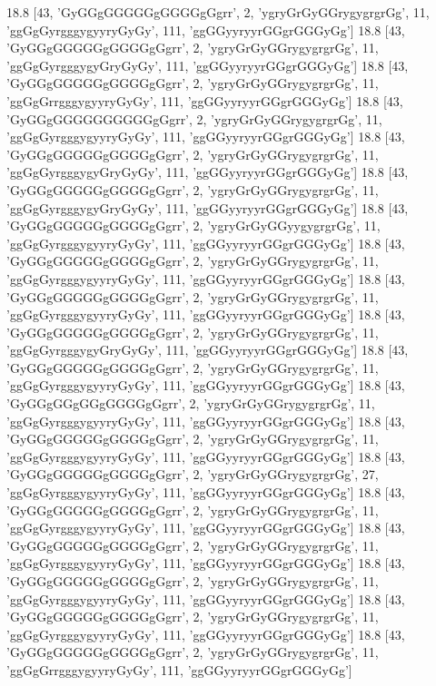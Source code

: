 18.8 [43, 'GyGGgGGGGGgGGGGgGgrr', 2, 'ygryGrGyGGrygygrgrGg', 11, 'ggGgGyrgggygyyryGyGy', 111, 'ggGGyyryyrGGgrGGGyGg']
18.8 [43, 'GyGGgGGGGGgGGGGgGgrr', 2, 'ygryGrGyGGrygygrgrGg', 11, 'ggGgGyrgggygyGryGyGy', 111, 'ggGGyyryyrGGgrGGGyGg']
18.8 [43, 'GyGGgGGGGGgGGGGgGgrr', 2, 'ygryGrGyGGrygygrgrGg', 11, 'ggGgGrrgggygyyryGyGy', 111, 'ggGGyyryyrGGgrGGGyGg']
18.8 [43, 'GyGGgGGGGGGGGGGgGgrr', 2, 'ygryGrGyGGrygygrgrGg', 11, 'ggGgGyrgggygyyryGyGy', 111, 'ggGGyyryyrGGgrGGGyGg']
18.8 [43, 'GyGGgGGGGGgGGGGgGgrr', 2, 'ygryGrGyGGrygygrgrGg', 11, 'ggGgGyrgggygyGryGyGy', 111, 'ggGGyyryyrGGgrGGGyGg']
18.8 [43, 'GyGGgGGGGGgGGGGgGgrr', 2, 'ygryGrGyGGrygygrgrGg', 11, 'ggGgGyrgggygyGryGyGy', 111, 'ggGGyyryyrGGgrGGGyGg']
18.8 [43, 'GyGGgGGGGGgGGGGgGgrr', 2, 'ygryGrGyGGyygygrgrGg', 11, 'ggGgGyrgggygyyryGyGy', 111, 'ggGGyyryyrGGgrGGGyGg']
18.8 [43, 'GyGGgGGGGGgGGGGgGgrr', 2, 'ygryGrGyGGrygygrgrGg', 11, 'ggGgGyrgggygyyryGyGy', 111, 'ggGGyyryyrGGgrGGGyGg']
18.8 [43, 'GyGGgGGGGGgGGGGgGgrr', 2, 'ygryGrGyGGrygygrgrGg', 11, 'ggGgGyrgggygyyryGyGy', 111, 'ggGGyyryyrGGgrGGGyGg']
18.8 [43, 'GyGGgGGGGGgGGGGgGgrr', 2, 'ygryGrGyGGrygygrgrGg', 11, 'ggGgGyrgggygyGryGyGy', 111, 'ggGGyyryyrGGgrGGGyGg']
18.8 [43, 'GyGGgGGGGGgGGGGgGgrr', 2, 'ygryGrGyGGrygygrgrGg', 11, 'ggGgGyrgggygyyryGyGy', 111, 'ggGGyyryyrGGgrGGGyGg']
18.8 [43, 'GyGGgGGgGGgGGGGgGgrr', 2, 'ygryGrGyGGrygygrgrGg', 11, 'ggGgGyrgggygyyryGyGy', 111, 'ggGGyyryyrGGgrGGGyGg']
18.8 [43, 'GyGGgGGGGGgGGGGgGgrr', 2, 'ygryGrGyGGrygygrgrGg', 11, 'ggGgGyrgggygyyryGyGy', 111, 'ggGGyyryyrGGgrGGGyGg']
18.8 [43, 'GyGGgGGGGGgGGGGgGgrr', 2, 'ygryGrGyGGrygygrgrGg', 27, 'ggGgGyrgggygyyryGyGy', 111, 'ggGGyyryyrGGgrGGGyGg']
18.8 [43, 'GyGGgGGGGGgGGGGgGgrr', 2, 'ygryGrGyGGrygygrgrGg', 11, 'ggGgGyrgggygyyryGyGy', 111, 'ggGGyyryyrGGgrGGGyGg']
18.8 [43, 'GyGGgGGGGGgGGGGgGgrr', 2, 'ygryGrGyGGrygygrgrGg', 11, 'ggGgGyrgggygyyryGyGy', 111, 'ggGGyyryyrGGgrGGGyGg']
18.8 [43, 'GyGGgGGGGGgGGGGgGgrr', 2, 'ygryGrGyGGrygygrgrGg', 11, 'ggGgGyrgggygyyryGyGy', 111, 'ggGGyyryyrGGgrGGGyGg']
18.8 [43, 'GyGGgGGGGGgGGGGgGgrr', 2, 'ygryGrGyGGrygygrgrGg', 11, 'ggGgGyrgggygyyryGyGy', 111, 'ggGGyyryyrGGgrGGGyGg']
18.8 [43, 'GyGGgGGGGGgGGGGgGgrr', 2, 'ygryGrGyGGrygygrgrGg', 11, 'ggGgGrrgggygyyryGyGy', 111, 'ggGGyyryyrGGgrGGGyGg']
